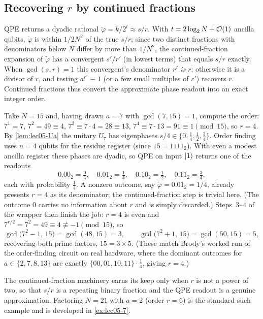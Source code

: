 \subsection*{Recovering \texorpdfstring{$r$}{r} by continued fractions}

QPE returns a dyadic rational $\tilde\varphi=k/2^{t}\approx s/r$. With
$t=2\log_2 N+\mathcal{O}(1)$ ancilla qubits, $\tilde\varphi$ is within $1/2N^{2}$ of the
true $s/r$; since two distinct fractions with denominators below $N$ differ by
more than $1/N^{2}$, the continued-fraction expansion of $\tilde\varphi$ has a
convergent $s'/r'$ (in lowest terms) that equals $s/r$ exactly. When $\gcd(s,r)=1$
this convergent's denominator $r'$ \emph{is} $r$; otherwise it is a divisor of
$r$, and testing $a^{r'}\equiv1$ (or a few small multiples of $r'$) recovers $r$.
Continued fractions thus convert the approximate phase readout into an exact
integer order.

\begin{example}[Factoring $N=15$ with $a=7$]
\label{exa:lec05-shor15}
Take $N=15$ and, having drawn $a=7$ with $\gcd(7,15)=1$, compute the order:
$7^{1}=7$, $7^{2}=49\equiv4$, $7^{3}\equiv 7\cdot4=28\equiv13$,
$7^{4}\equiv7\cdot13=91\equiv1\pmod{15}$, so $r=4$. By \cref{lem:lec05-Ua} the
unitary $U_7$ has eigenphases $s/4\in\{0,\tfrac14,\tfrac12,\tfrac34\}$. Order
finding uses $n=4$ qubits for the residue register (since $15=1111_2$). With even
a modest ancilla register these phases are dyadic, so QPE on input $\ket{1}$
returns one of the readouts
\[
  0.00_2=\tfrac{0}{4},\quad 0.01_2=\tfrac14,\quad
  0.10_2=\tfrac12,\quad 0.11_2=\tfrac34,
\]
each with probability $\tfrac14$. A nonzero outcome, say $\tilde\varphi=0.01_2=1/4$,
already presents $r=4$ as its denominator; the continued-fraction step is trivial
here. (The outcome $0$ carries no information about $r$ and is simply discarded.)
Steps~3--4 of the wrapper then finish the job: $r=4$ is even and
$7^{r/2}=7^{2}=49\equiv 4\not\equiv-1\pmod{15}$, so
\[
  \gcd\bigl(7^{2}-1,\,15\bigr)=\gcd(48,15)=3,
  \qquad
  \gcd\bigl(7^{2}+1,\,15\bigr)=\gcd(50,15)=5,
\]
recovering both prime factors, $15=3\times5$. (These match Brody's worked run of
the order-finding circuit on real hardware, where the dominant outcomes for
$a\in\{2,7,8,13\}$ are exactly $\{00,01,10,11\}\!\cdot\!\tfrac14$, giving $r=4$.)
\end{example}

The continued-fraction machinery earns its keep only when $r$ is not a power of
two, so that $s/r$ is a repeating binary fraction and the QPE readout is a genuine
approximation. Factoring $N=21$ with $a=2$ (order $r=6$) is the standard such
example and is developed in \cref{ex:lec05-7}.

